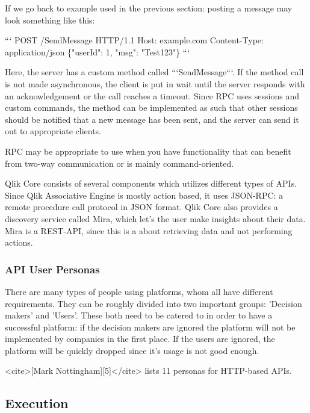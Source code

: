 \documentclass[11pt]{article}
\begin{document}
\begin{multicols}{2}
        If we go back to example used in the previous section: posting a message
        may look something like this:

        ```
        POST /SendMessage HTTP/1.1
        Host: example.com
        Content-Type: application/json
        \{"userId": 1, "msg": "Test123"\}
        ```

    Here, the server has a custom method called ```SendMessage```. If the
    method call is not made asynchronous, the client is put in wait until
    the server responds with an acknowledgement or the call reaches a
    timeout. Since RPC uses sessions and custom commands, the method can be
    implemented as such that other sessions should be notified that a new
    message has been sent, and the server can send it out to appropriate
    clients.

    RPC may be appropriate to use when you have functionality that can
    benefit from two-way communication or is mainly command-oriented.


    Qlik Core consists of several components which utilizes different types
    of APIs. Since Qlik Associative Engine is mostly action based, it uses
    JSON-RPC: a remote procedure call protocol in JSON format. Qlik Core
    also provides a discovery service called Mira, which let's the user make
    insights about their data. Mira is a REST-API, since this is a about
    retrieving data and not performing actions.

    \subsubsection{API User Personas}

    There are many types of people using platforms, whom all have different
    requirements. They can be roughly divided into two important groups:
    'Decision makers' and 'Users'. These both need to be catered to in order
    to have a successful platform: if the decision makers are ignored the
    platform will not be implemented by companies in the first place. If the
    users are ignored, the platform will be quickly dropped since it's usage
    is not good enough.

    <cite>[Mark Nottingham][5]</cite> lists 11 personas for HTTP-based APIs.

    \subsection{Execution}



\end{multicols}
\end{document}
